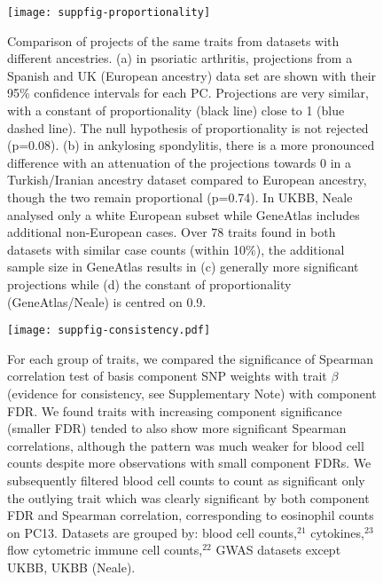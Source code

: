 \documentclass[11pt]{article}
\begin{document}
 
 \begin{figure}
   \centering
   \texttt{[image: suppfig-proportionality]}
   \caption{Comparison of projects of the same traits from datasets with different ancestries.
     (a) in psoriatic arthritis, projections from a Spanish and UK (European ancestry) data set are shown with their 95\% confidence intervals for each PC. Projections are very similar, with a constant of proportionality (black line) close to 1 (blue dashed line). The null hypothesis of proportionality is not rejected (p=0.08). (b) in ankylosing spondylitis, there is a more pronounced difference with an attenuation of the projections towards 0 in a Turkish/Iranian ancestry dataset compared to European ancestry, though the two remain proportional (p=0.74).
     In UKBB, Neale analysed only a white European subset while GeneAtlas includes additional non-European cases.  Over 78 traits found in both datasets with similar case counts (within 10\%), the additional sample size in GeneAtlas results in (c) generally more significant projections while (d) 
the constant of proportionality (GeneAtlas/Neale) is centred on 0.9.}
  \label{sfig:2}
\end{figure}

 
 \begin{figure}
  \centering
  \texttt{[image: suppfig-consistency.pdf]}
  \caption{For each group of traits, we compared the significance of Spearman correlation test of basis component SNP weights with trait $\beta$ (evidence for consistency, see Supplementary Note) with component FDR. We found traits with increasing component significance (smaller FDR) tended to also show more significant Spearman correlations, although the pattern was much weaker for blood cell counts despite more observations with small component FDRs.  We subsequently filtered blood cell counts to count as significant only the outlying trait which was clearly significant by both component FDR and Spearman correlation, corresponding to eosinophil counts on PC13. Datasets are grouped by: blood cell counts,$^{21}$ cytokines,$^{23}$ flow cytometric immune cell counts,$^{22}$ GWAS datasets except UKBB, UKBB (Neale).}
  \label{sfig:2}
\end{figure}


\end{document}
